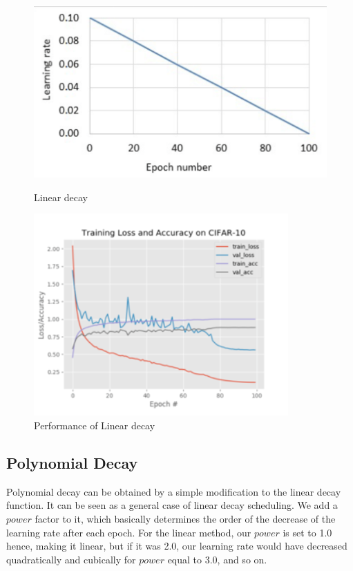 \begin{figure}[!ht]
  \centering
  \begin{minipage}[b]{0.4\textwidth}
    \includegraphics[width=\textwidth]{./imgs/2019A7PS0097P-08.png}
    \caption{Linear decay}
    \label{fig:linear_decay}
  \end{minipage}
  \hfill
  \begin{minipage}[b]{0.4\textwidth}
    \includegraphics[width=\textwidth]{./imgs/2019A7PS0097P-07.png}
    \caption{Performance of Linear decay}
  \end{minipage}
\end{figure}
\newpage
\subsection{Polynomial Decay}
Polynomial decay can be obtained by a simple modification to the linear decay function. It can be seen as a general case of linear decay scheduling. We add a \(power\) factor to it, which basically determines the order of the decrease of the learning rate after each epoch. For the linear method, our \(power\) is set to 1.0 hence, making it linear, but if it was 2.0, our learning rate would have decreased quadratically and cubically for \(power\) equal to 3.0, and so on. 

